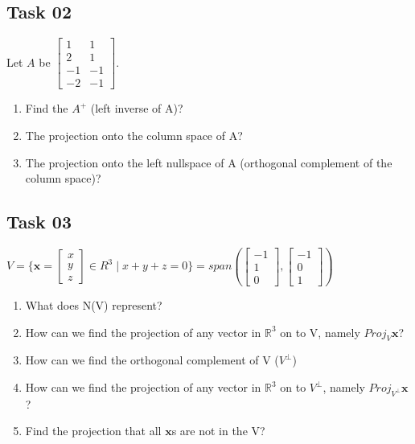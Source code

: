 \documentclass[12pt]{article}%
\begin{document}
\subsection{Task 02} 
Let $A$ be $\begin{bmatrix}
1 & 1\\ 
 2 & 1\\ 
 -1 & -1 \\ 
-2 & -1
\end{bmatrix}$.

\begin{enumerate}
    \item Find the $A^{+}$ (left inverse of A)?
    \item The projection onto the column space of A?
    \item The projection onto the left nullspace of A (orthogonal complement of the column space)?
\end{enumerate}

\subsection{Task 03}
$V = \{\mathbf{x} = \begin{bmatrix}
x\\ 
y\\ 
z
\end{bmatrix} \in R^3 \mid x + y + z = 0 \} = span
\left (
\begin{bmatrix}
-1\\ 
1\\ 
0
\end{bmatrix},\begin{bmatrix}
-1\\ 
0\\ 
1
\end{bmatrix}  \right ) $
\begin{enumerate}
    \item  What does N(V) represent?
    \item How can we find the projection of any vector in $\mathbb{R}^3$ on to V, namely $Proj_V \mathbf{x}$?
    \item How can we find the orthogonal complement of V  ($V^{\perp}$)
     \item How can we find the projection of any vector in $\mathbb{R}^3$ on to $V^{\perp}$, namely $Proj_{V^{\perp}} \mathbf{x}$? 
     \item Find the projection that all $\mathbf{x}$s are not in the V?
\end{enumerate}
\end{document}
